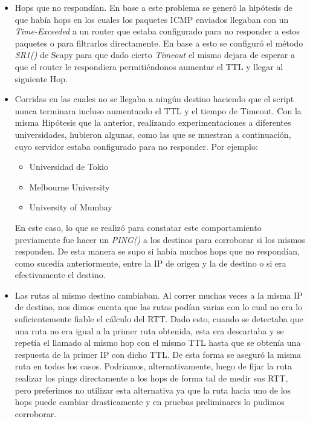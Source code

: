 \begin{itemize}
    \item Hops que no respondían. En base a este problema se generó la hipótesis de que había hops en los cuales los paquetes ICMP enviados llegaban con un \textit{Time-Exceeded} a un router que estaba configurado para no responder a estos paquetes o para filtrarlos directamente. En base a esto se configuró el método \textit{SR1()} de Scapy para que dado cierto \textit{Timeout} el mismo dejara de esperar a que el router le respondiera permitiéndonos aumentar el TTL y llegar al siguiente Hop.
    
    \item Corridas en las cuales no se llegaba a ningún destino haciendo que el script nunca terminara incluso aumentando el TTL y el tiempo de Timeout. Con la misma Hipótesis que la anterior, realizando experimentaciones a diferentes universidades, hubieron algunas, como las que se muestran a continuación, cuyo servidor estaba configurado para no responder. Por ejemplo:
    \begin{itemize}
        \item Universidad de Tokio
        \item Melbourne University
        \item University of Mumbay
    \end{itemize}
    En este caso, lo que se realizó para constatar este comportamiento previamente fue hacer un \textit{PING()} a los destinos para corroborar si los mismos responden. De esta manera se supo si había muchos hops que no respondían, como sucedía anteriormente, entre la IP de origen y la de destino o si era efectivamente el destino.

    \item Las rutas al mismo destino cambiaban. Al correr muchas veces a la misma IP de destino, nos dimos cuenta que las rutas podían varias con lo cual no era lo suficientemente fiable el cálculo del RTT. Dado esto, cuando se detectaba que una ruta no era igual a la primer ruta obtenida, esta era descartaba y se repetía el llamado al mismo hop con el mismo TTL hasta que se obtenía una respuesta de la primer IP con dicho TTL. De esta forma se aseguró la misma ruta en todos los casos. Podriamos, alternativamente, luego de fijar la ruta realizar los pings directamente a los hops de forma tal de medir sus RTT, pero preferimos no utilizar esta alternativa ya que la ruta hacia uno de los hops puede cambiar drasticamente y en pruebas preliminares lo pudimos corroborar.
    

\end{itemize}
